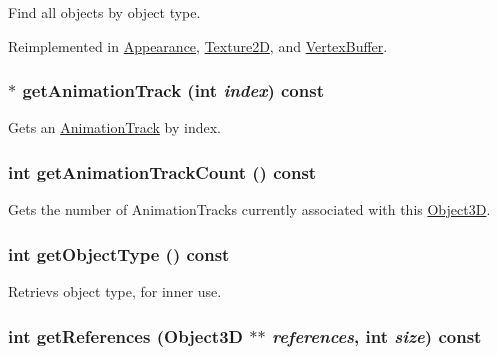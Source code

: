 Find all objects by object type. 

Reimplemented in \hyperlink{classm3g_1_1Appearance_4dadb21b568b0230fac106f15040138c}{Appearance}, \hyperlink{classm3g_1_1Texture2D_4dadb21b568b0230fac106f15040138c}{Texture2D}, and \hyperlink{classm3g_1_1VertexBuffer_4dadb21b568b0230fac106f15040138c}{VertexBuffer}.\hypertarget{classm3g_1_1Object3D_f0978f3f2efe3227ca613da3361424dd}{
\subsubsection[{getAnimationTrack}]{ $\ast$ getAnimationTrack (int {\em index}) const}}
\label{classm3g_1_1Object3D_f0978f3f2efe3227ca613da3361424dd}


Gets an \hyperlink{classm3g_1_1AnimationTrack}{AnimationTrack} by index. \hypertarget{classm3g_1_1Object3D_0926843b66090795972850376b8e4e6c}{
\subsubsection[{getAnimationTrackCount}]{\setlength{\rightskip}{0pt plus 5cm}int getAnimationTrackCount () const}}
\label{classm3g_1_1Object3D_0926843b66090795972850376b8e4e6c}


Gets the number of AnimationTracks currently associated with this \hyperlink{classm3g_1_1Object3D}{Object3D}. \hypertarget{classm3g_1_1Object3D_06be1b37b707b5f227cba2308043f3df}{
\subsubsection[{getObjectType}]{\setlength{\rightskip}{0pt plus 5cm}int getObjectType () const}}
\label{classm3g_1_1Object3D_06be1b37b707b5f227cba2308043f3df}


Retrievs object type, for inner use. \hypertarget{classm3g_1_1Object3D_ddf91fbaaa866aa7aad5d530a69feba8}{
\subsubsection[{getReferences}]{\setlength{\rightskip}{0pt plus 5cm}int getReferences ({\bf Object3D} $\ast$$\ast$ {\em references}, \/  int {\em size}) const}}
\label{classm3g_1_1Object3D_ddf91fbaaa866aa7aad5d530a69feba8}


